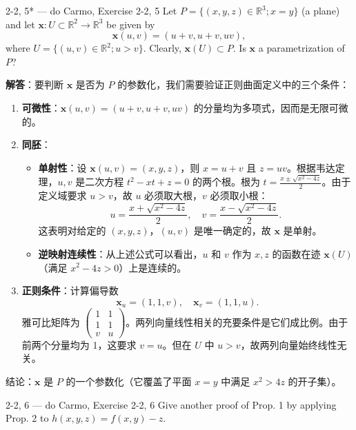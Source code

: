 \begin{exercise}{2-2, 5* — do Carmo, Exercise 2-2, 5}
Let $P = \{(x, y, z) \in \mathbb{R}^3; x = y\}$ (a plane) and let $\mathbf{x}: U \subset \mathbb{R}^2 \to \mathbb{R}^3$ be given by
\[
\mathbf{x}(u, v) = (u + v, u + v, uv),
\]
where $U = \{(u,v)\in \mathbb{R}^2;u > v\}$. Clearly, $\mathbf{x}(U)\subset P$. Is $\mathbf{x}$ a parametrization of $P$?
\end{exercise}

\begin{solution}
\textbf{解答}：要判断 $\mathbf{x}$ 是否为 $P$ 的参数化，我们需要验证正则曲面定义中的三个条件：

\begin{enumerate}
    \item \textbf{可微性}：$\mathbf{x}(u, v) = (u+v, u+v, uv)$ 的分量均为多项式，因而是无限可微的。

    \item \textbf{同胚}：
    \begin{itemize}
        \item \textbf{单射性}：设 $\mathbf{x}(u, v) = (x, y, z)$，则 $x = u+v$ 且 $z = uv$。根据韦达定理，$u, v$ 是二次方程 $t^2 - xt + z = 0$ 的两个根。根为 $t = \frac{x \pm \sqrt{x^2 - 4z}}{2}$。由于定义域要求 $u > v$，故 $u$ 必须取大根，$v$ 必须取小根：
        \[
        u = \frac{x + \sqrt{x^2 - 4z}}{2}, \quad v = \frac{x - \sqrt{x^2 - 4z}}{2}.
        \]
        这表明对给定的 $(x, y, z)$，$(u, v)$ 是唯一确定的，故 $\mathbf{x}$ 是单射。
        \item \textbf{逆映射连续性}：从上述公式可以看出，$u$ 和 $v$ 作为 $x, z$ 的函数在迹 $\mathbf{x}(U)$（满足 $x^2 - 4z > 0$）上是连续的。
    \end{itemize}

    \item \textbf{正则条件}：计算偏导数
    \[
    \mathbf{x}_u = (1, 1, v), \quad \mathbf{x}_v = (1, 1, u).
    \]
    雅可比矩阵为 $\begin{pmatrix} 1 & 1 \\ 1 & 1 \\ v & u \end{pmatrix}$。两列向量线性相关的充要条件是它们成比例。由于前两个分量均为 1，这要求 $v = u$。但在 $U$ 中 $u > v$，故两列向量始终线性无关。
\end{enumerate}
结论：$\mathbf{x}$ 是 $P$ 的一个参数化（它覆盖了平面 $x=y$ 中满足 $x^2 > 4z$ 的开子集）。
\end{solution}

\begin{exercise}{2-2, 6 — do Carmo, Exercise 2-2, 6}
Give another proof of Prop. 1 by applying Prop. 2 to $h(x, y, z) = f(x, y) - z$.
\end{exercise}

